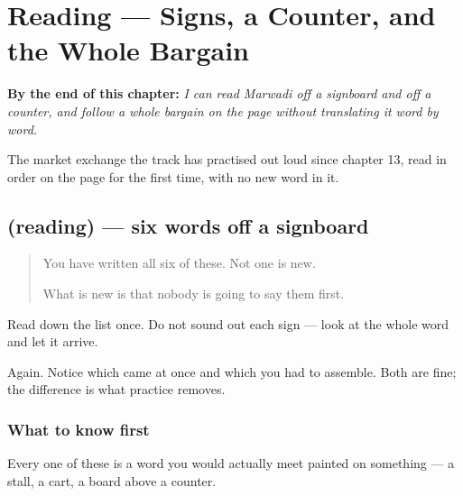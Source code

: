 
\chapter{Reading — Signs, a Counter, and the Whole Bargain}
\label{ch:mw-pehlo-path}

\begin{chapteropening}
\textbf{By the end of this chapter:} \emph{I can read Marwadi off a signboard and off a counter, and follow a whole bargain on the page without translating it word by word.}

The market exchange the track has practised out loud since chapter 13, read in order on the page for the first time, with no new word in it.
\end{chapteropening}

\section[(reading)]{(reading) — six words off a signboard}

\label{lesson:MW-C40-signs}



\begin{quote}
You have written all six of these. Not one is new.

What is new is that nobody is going to say them first.
\end{quote}

\begin{tcolorbox}[breakable,skin=enhanced,colback=orange!6,colframe=orange!45!black,boxrule=0.5pt,arc=1mm,left=6pt,right=6pt,top=4pt,bottom=4pt,fonttitle=\bfseries,title={Read this}]
\begin{quote}
     
\end{quote}

Read down the list once. Do not sound out each sign — look at the whole word and let it arrive.

Again. Notice which came at once and which you had to assemble. Both are fine; the difference is what practice removes.
\end{tcolorbox}

\subsection*{What to know first}
Every one of these is a word you would actually meet painted on something — a stall, a cart, a board above a counter.


